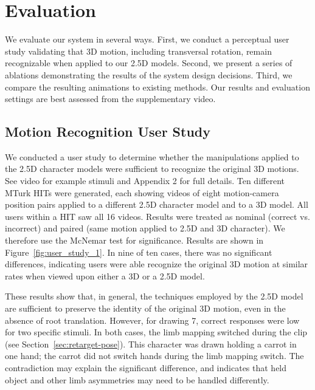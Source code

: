 \section{Evaluation}

We evaluate our system in several ways.
First, we conduct a perceptual user study validating that 3D motion, including transversal rotation, remain recognizable when applied to our 2.5D models.
Second, we present a series of ablations demonstrating the results of the system design decisions.
Third, we compare the resulting animations to existing methods. Our results and evaluation settings are best assessed from the supplementary video.

\subsection{Motion Recognition User Study}
\label{sec:recognition}
We conducted a user study to determine whether the manipulations applied to the 2.5D character models were sufficient to recognize the original 3D motions.
See video for example stimuli and Appendix 2 for full details.
Ten different MTurk HITs were generated, each showing videos of eight motion-camera position pairs applied to a different 2.5D character model and to a 3D model.
All users within a HIT saw all 16 videos.
Results were treated as nominal (correct vs. incorrect) and paired (same motion applied to 2.5D and 3D character). We therefore use the McNemar test for significance.
Results are shown in Figure~\ref{fig:user_study_1}. In nine of ten cases, there was no significant differences, indicating users were able recognize the original 3D motion at similar rates when viewed upon either a 3D or a 2.5D model.

These results show that, in general, the techniques employed by the 2.5D model are sufficient to preserve the identity of the original 3D motion, even in the absence of root translation.
However, for drawing 7, correct responses were low for two specific stimuli.
In both cases, the limb mapping switched during the clip (see Section~\ref{sec:retarget-pose}).
This character was drawn holding a carrot in one hand; the carrot did not switch hands during the limb mapping switch.
The contradiction may explain the significant difference, and indicates that held object and other limb asymmetries may need to be handled differently.


